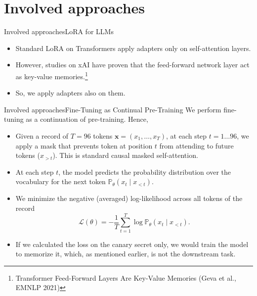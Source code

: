 \documentclass[10pt,aspectratio=43
	]{beamer}
\begin{document}
\section{Involved approaches}

	\begin{frame}{Involved approaches}{LoRA for LLMs}
        \begin{itemize}
            \item Standard LoRA on Transformers apply adapters only on self-attention layers.
            \item However, studies on xAI have proven that the feed-forward network layer act as key-value memories.\footnote[frame]{Transformer Feed-Forward Layers Are Key-Value Memories (Geva et al., EMNLP 2021)}
            \item So, we apply adapters also on them.
        \end{itemize}
    \end{frame}

	\begin{frame}{Involved approaches}{Fine-Tuning as Continual Pre-Training}
        We perform fine-tuning as a continuation of pre-training. Hence,
        \begin{itemize}
            \item Given a record of $T = 96$ tokens $\mathbf{x} = (x_1, \dots, x_T)$, at each step $t=1\ldots 96$, we apply a mask that prevents token at position $t$ from attending to future tokens ($x_{>t}$). This is standard \alert{causal masked self-attention}.
            \item At each step $t$, the model predicts the probability distribution over the vocabulary for the next token $\mathbb{P}_{\theta}(x_t \mid x_{<t})$.
            \item We \alert{minimize} the negative (averaged) log-likelihood \alert{across all tokens} of the record
            $$\mathcal{L}(\theta) = -\frac{1}{T}\sum_{t=1}^{T}\log\mathbb{P}_{\theta}(x_t \mid x_{<t}).$$
            \item If we calculated the loss on the canary secret only, we would train the model to memorize it, which, as mentioned earlier, is not the downstream task.
        \end{itemize}
    \end{frame}
\end{document}
